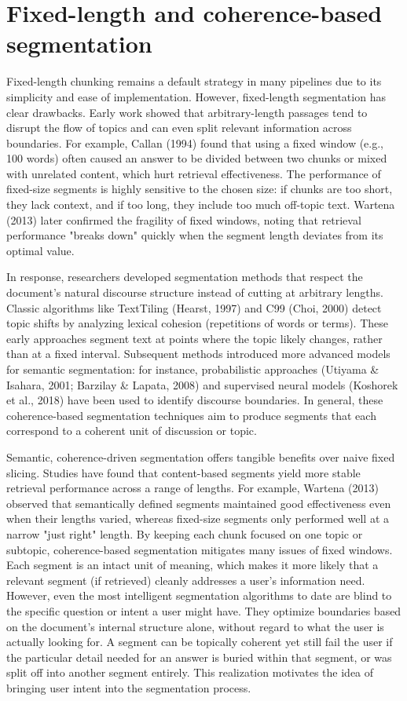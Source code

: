 \documentclass[12pt,a4paper]{report}
\begin{document}
\section{Fixed-length and coherence-based segmentation}

Fixed-length chunking remains a default strategy in many pipelines due to its simplicity and ease of implementation. However, fixed-length segmentation has clear drawbacks. Early work showed that arbitrary-length passages tend to disrupt the flow of topics and can even split relevant information across boundaries. For example, Callan (1994) found that using a fixed window (e.g., 100 words) often caused an answer to be divided between two chunks or mixed with unrelated content, which hurt retrieval effectiveness. The performance of fixed-size segments is highly sensitive to the chosen size: if chunks are too short, they lack context, and if too long, they include too much off-topic text. Wartena (2013) later confirmed the fragility of fixed windows, noting that retrieval performance "breaks down" quickly when the segment length deviates from its optimal value.

In response, researchers developed segmentation methods that respect the document's natural discourse structure instead of cutting at arbitrary lengths. Classic algorithms like TextTiling (Hearst, 1997) and C99 (Choi, 2000) detect topic shifts by analyzing lexical cohesion (repetitions of words or terms). These early approaches segment text at points where the topic likely changes, rather than at a fixed interval. Subsequent methods introduced more advanced models for semantic segmentation: for instance, probabilistic approaches (Utiyama \& Isahara, 2001; Barzilay \& Lapata, 2008) and supervised neural models (Koshorek et al., 2018) have been used to identify discourse boundaries. In general, these coherence-based segmentation techniques aim to produce segments that each correspond to a coherent unit of discussion or topic.

Semantic, coherence-driven segmentation offers tangible benefits over naive fixed slicing. Studies have found that content-based segments yield more stable retrieval performance across a range of lengths. For example, Wartena (2013) observed that semantically defined segments maintained good effectiveness even when their lengths varied, whereas fixed-size segments only performed well at a narrow "just right" length. By keeping each chunk focused on one topic or subtopic, coherence-based segmentation mitigates many issues of fixed windows. Each segment is an intact unit of meaning, which makes it more likely that a relevant segment (if retrieved) cleanly addresses a user's information need. However, even the most intelligent segmentation algorithms to date are blind to the specific question or intent a user might have. They optimize boundaries based on the document's internal structure alone, without regard to what the user is actually looking for. A segment can be topically coherent yet still fail the user if the particular detail needed for an answer is buried within that segment, or was split off into another segment entirely. This realization motivates the idea of bringing user intent into the segmentation process.
\end{document}
